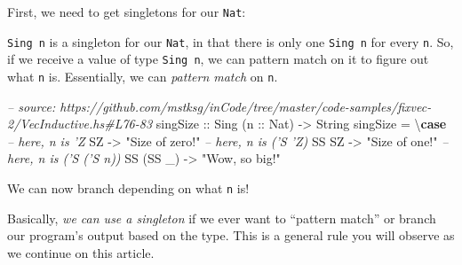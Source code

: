 \documentclass[]{article}
\newenvironment{Shaded}{}{}
\newcommand{\KeywordTok}[1]{\textcolor[rgb]{0.00,0.44,0.13}{\textbf{#1}}}
\newcommand{\DataTypeTok}[1]{\textcolor[rgb]{0.56,0.13,0.00}{#1}}
\newcommand{\CharTok}[1]{\textcolor[rgb]{0.25,0.44,0.63}{#1}}
\newcommand{\StringTok}[1]{\textcolor[rgb]{0.25,0.44,0.63}{#1}}
\newcommand{\CommentTok}[1]{\textcolor[rgb]{0.38,0.63,0.69}{\textit{#1}}}
\newcommand{\OtherTok}[1]{\textcolor[rgb]{0.00,0.44,0.13}{#1}}
\newcommand{\FunctionTok}[1]{\textcolor[rgb]{0.02,0.16,0.49}{#1}}
\newcommand{\NormalTok}[1]{#1}
\begin{document}
First, we need to get singletons for our \texttt{Nat}:

\begin{Shaded}
\end{Shaded}

\texttt{Sing\ n} is a singleton for our \texttt{Nat}, in that there is only one
\texttt{Sing\ n} for every \texttt{n}. So, if we receive a value of type
\texttt{Sing\ n}, we can pattern match on it to figure out what \texttt{n} is.
Essentially, we can \emph{pattern match} on \texttt{n}.

\begin{Shaded}
\begin{Highlighting}[]
\CommentTok{-- source: https://github.com/mstksg/inCode/tree/master/code-samples/fixvec-2/VecInductive.hs#L76-83}
\OtherTok{singSize ::} \DataTypeTok{Sing}\NormalTok{ (}\OtherTok{n ::} \DataTypeTok{Nat}\NormalTok{) }\OtherTok{->} \DataTypeTok{String}
\NormalTok{singSize }\FunctionTok{=}\NormalTok{ \textbackslash{}}\KeywordTok{case}
    \CommentTok{-- here, n is 'Z}
    \DataTypeTok{SZ}        \OtherTok{->} \StringTok{"Size of zero!"}
    \CommentTok{-- here, n is ('S 'Z)}
    \DataTypeTok{SS} \DataTypeTok{SZ}     \OtherTok{->} \StringTok{"Size of one!"}
    \CommentTok{-- here, n is ('S ('S n))}
    \DataTypeTok{SS}\NormalTok{ (}\DataTypeTok{SS}\NormalTok{ _) }\OtherTok{->} \StringTok{"Wow, so big!"}
\end{Highlighting}
\end{Shaded}

We can now branch depending on what \texttt{n} is!

Basically, \emph{we can use a singleton} if we ever want to ``pattern match'' or
branch our program's output based on the type. This is a general rule you will
observe as we continue on this article.
\end{document}
